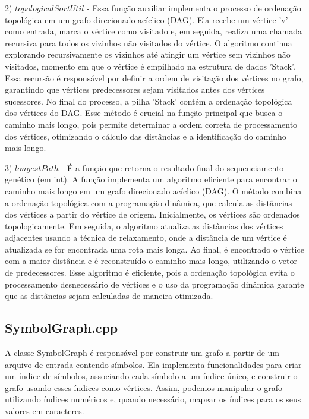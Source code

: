 \documentclass{article}
\begin{document}
\begin{multicols}{2}
2) $topologicalSortUtil$ - Essa função auxiliar implementa o processo de ordenação topológica em um grafo direcionado acíclico (DAG). Ela recebe um vértice 'v' como entrada, marca o vértice como visitado e, em seguida, realiza uma chamada recursiva para todos os vizinhos não visitados do vértice. O algoritmo continua explorando recursivamente os vizinhos até atingir um vértice sem vizinhos não visitados, momento em que o vértice é empilhado na estrutura de dados 'Stack'. Essa recursão é responsável por definir a ordem de visitação dos vértices no grafo, garantindo que vértices predecessores sejam visitados antes dos vértices sucessores. No final do processo, a pilha 'Stack' contém a ordenação topológica dos vértices do DAG. Esse método é crucial na função principal que busca o caminho mais longo, pois permite determinar a ordem correta de processamento dos vértices, otimizando o cálculo das distâncias e a identificação do caminho mais longo.

3) $longestPath$ - É a função que retorna o resultado final do sequenciamento genético (em int). A função implementa um algoritmo eficiente para encontrar o caminho mais longo em um grafo direcionado acíclico (DAG). O método combina a ordenação topológica com a programação dinâmica, que calcula as distâncias dos vértices a partir do vértice de origem. Inicialmente, os vértices são ordenados topologicamente. Em seguida, o algoritmo atualiza as distâncias dos vértices adjacentes usando a técnica de relaxamento, onde a distância de um vértice é atualizada se for encontrada uma rota mais longa. Ao final, é encontrado o vértice com a maior distância e é reconstruído o caminho mais longo, utilizando o vetor de predecessores. Esse algoritmo é eficiente, pois a ordenação topológica evita o processamento desnecessário de vértices e o uso da programação dinâmica garante que as distâncias sejam calculadas de maneira otimizada.

\subsection{SymbolGraph.cpp}
A classe SymbolGraph é responsável por construir um grafo a partir de um arquivo de entrada contendo símbolos. Ela implementa funcionalidades para criar um índice de símbolos, associando cada símbolo a um índice único, e construir o grafo usando esses índices como vértices.
Assim, podemos manipular o grafo utilizando índices numéricos e, quando necessário, mapear os índices para os seus valores em caracteres.


\end{multicols}
\end{document}
